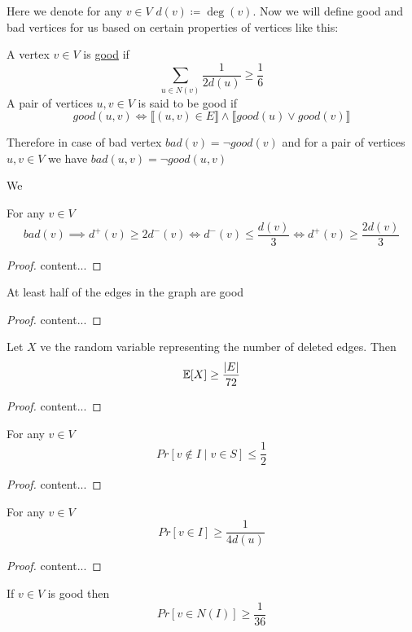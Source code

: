 





\parinf Here we denote for any $v\in V$ $d(v)\coloneqq \deg(v)$. Now we will define good and bad vertices for us based on certain properties of vertices like this:\parinn

	A vertex $ v\in V$ is \underline{good} if $$\sum_{u\in N(v)}\frac{1}{2d(u)}\geq \frac16$$A pair of vertices $u,v\in V$ is said to be good if $$good(u,v)\iff \llbracket(u,v)\in E\rrbracket\wedge\llbracket good(u)\vee good(v)\rrbracket$$

Therefore in case of bad vertex $bad(v)=\neg good(v)$ and for a pair of vertices $u,v\in V$ we have $bad(u,v)=\neg good(u,v)$

We 

\begin{lemma}
	For any $v\in V$	$$bad(v)\implies d^+(v)\geq 2d^-(v)\iff  d^-(v)\leq \frac{d(v)}{3}\iff d^+(v)\geq \frac{2d(v)}{3}$$
\end{lemma}
\begin{proof}
	content...
\end{proof}

\begin{lemma}
	At least half of the edges in the graph are good
\end{lemma}
\begin{proof}
	content...
\end{proof}

\begin{lemma}
	Let $X$ ve the random variable representing the number of deleted edges. Then $$\mathbb{E}[X]\geq \frac{|E|}{72}$$
\end{lemma}
\begin{proof}
	content...
\end{proof}

\begin{lemma}
		For any $v\in V$ $$Pr[v\notin I\mid v\in S]\leq \frac12$$
\end{lemma}
\begin{proof}
	content...
\end{proof}

\begin{lemma}
		For any $v\in V$ $$Pr[v\in I]\geq \frac{1}{4d(u)}$$
\end{lemma}
\begin{proof}
	content...
\end{proof}

\begin{lemma}
	If $v\in V$ is good then $$Pr[v\in N(I)]\geq \frac1{36}$$
\end{lemma}